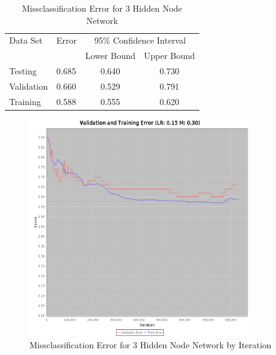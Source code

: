 \documentclass{article}
\begin{document}
\begin{table}
\caption{Missclassification Error for 3 Hidden Node Network}
\begin{center}
\begin{tabular}{llcc}
\toprule
Data Set & Error & \multicolumn{2}{c}{95\% Confidence Interval} \\
\cmidrule(r){3-4}
& & Lower Bound & Upper Bound \\
\midrule
Testing       & 0.685 &  0.640 & 0.730  \\
Validation    & 0.660 &  0.529 & 0.791  \\
Training      & 0.588 &  0.555 & 0.620  \\
\bottomrule
\end{tabular}
\label{table3}
\end{center}
\end{table}

\begin{figure}
\centering
\includegraphics[width=0.85\textwidth]{data/final/3_hidden_node_error.png}
\caption{Missclassification Error for 3 Hidden Node Network by Iteration}
\label{error3}
\end{figure}
\end{document}

